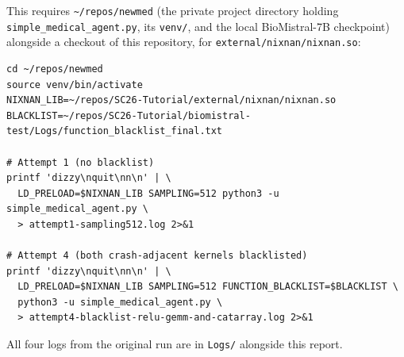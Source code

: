 \documentclass[11pt]{article}
\begin{document}
This requires \texttt{\textasciitilde/repos/newmed} (the private project
directory holding \texttt{simple\_medical\_agent.py}, its \texttt{venv/},
and the local BioMistral-7B checkpoint) alongside a checkout of this
repository, for \texttt{external/nixnan/nixnan.so}:

\begin{lstlisting}
cd ~/repos/newmed
source venv/bin/activate
NIXNAN_LIB=~/repos/SC26-Tutorial/external/nixnan/nixnan.so
BLACKLIST=~/repos/SC26-Tutorial/biomistral-test/Logs/function_blacklist_final.txt

# Attempt 1 (no blacklist)
printf 'dizzy\nquit\nn\n' | \
  LD_PRELOAD=$NIXNAN_LIB SAMPLING=512 python3 -u simple_medical_agent.py \
  > attempt1-sampling512.log 2>&1

# Attempt 4 (both crash-adjacent kernels blacklisted)
printf 'dizzy\nquit\nn\n' | \
  LD_PRELOAD=$NIXNAN_LIB SAMPLING=512 FUNCTION_BLACKLIST=$BLACKLIST \
  python3 -u simple_medical_agent.py \
  > attempt4-blacklist-relu-gemm-and-catarray.log 2>&1
\end{lstlisting}

All four logs from the original run are in \texttt{Logs/} alongside this
report.
\end{document}
